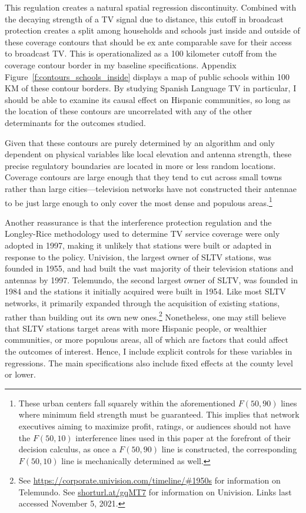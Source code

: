 \documentclass[11pt]{article}
\begin{document}

This regulation creates a natural spatial regression discontinuity. Combined with the decaying strength of a TV signal due to distance, this cutoff in broadcast protection creates a split among households and schools just inside and outside of these coverage contours that should be ex ante comparable save for their access to broadcast TV. This is operationalized as a 100 kilometer cutoff from the coverage contour border in my baseline specifications. Appendix Figure~\ref{f:contours_schools_inside} displays a map of public schools within 100 KM of these contour borders. By studying Spanish Language TV in particular, I should be able to examine its causal effect on Hispanic communities, so long as the location of these contours are uncorrelated with any of the other determinants for the outcomes studied. 

Given that these contours are purely determined by an algorithm and only dependent on physical variables like local elevation and antenna strength, these precise regulatory boundaries are located in more or less random locations. Coverage contours are large enough that they tend to cut across small towns rather than large cities---television networks have not constructed their antennae to be just large enough to only cover the most dense and populous areas.\footnote{ These urban centers fall squarely within the aforementioned $F(50,90)$ lines where minimum field strength must be guaranteed. This implies that network executives aiming to maximize profit, ratings, or audiences should not have the $F(50,10)$ interference lines used in this paper at the forefront of their decision calculus, as once a $F(50,90)$ line is constructed, the corresponding $F(50,10)$ line is mechanically determined as well.} 

Another reassurance is that the interference protection regulation and the Longley-Rice methodology used to determine TV service coverage were only adopted in 1997, making it unlikely that stations were built or adapted in response to the policy. Univision, the largest owner of SLTV stations, was founded in 1955, and had built the vast majority of their television stations and antennas by 1997. Telemundo, the second largest owner of SLTV, was founded in 1984 and the stations it initially acquired were built in 1954. Like most SLTV networks, it primarily expanded through the acquisition of existing stations, rather than building out its own new ones.\footnote{  See \url{https://corporate.univision.com/timeline/\#1950s} for information on Telemundo. See \url{shorturl.at/gqMT7} for information on Univision. Links last accessed November 5, 2021.} Nonetheless, one may still believe that SLTV stations target areas with more Hispanic people, or wealthier communities, or more populous areas, all of which are factors that could affect the outcomes of interest. Hence, I include explicit controls for these variables in regressions. The main specifications also include fixed effects at the county level or lower.
\end{document}
